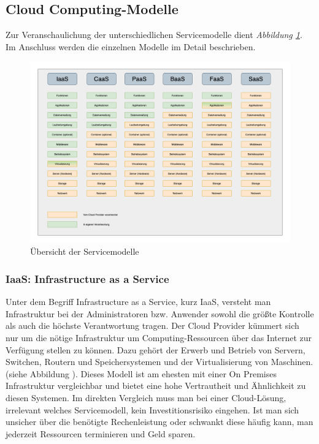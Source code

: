 \clearpage

\subsection{Cloud Computing-Modelle}
\label{Servicemodelle}
Zur Veranschaulichung der unterschiedlichen Servicemodelle dient \textit{Abbildung \ref{fig:Servicemodelle}}.
Im Anschluss werden die einzelnen Modelle im Detail beschrieben.


\begin{figure}[htbp]
    \centering
    \includegraphics[width=1.0\textwidth]{30-Serverless-Theorie/ServiceModelle.png}
    \caption{Übersicht der Servicemodelle}
    \label{fig:Servicemodelle}
\end{figure}


   \subsubsection{IaaS: Infrastructure as a Service}
   Unter dem Begriff Infrastructure as a Service, kurz IaaS, versteht man Infrastruktur bei der Administratoren bzw. Anwender sowohl die größte Kontrolle als auch die höchste Verantwortung tragen.
   Der Cloud Provider kümmert sich nur um die nötige Infrastruktur um Computing-Ressourcen über das Internet zur Verfügung stellen zu können.
   Dazu gehört der Erwerb und Betrieb von Servern, Switchen, Routern und Speichersystemen und der Virtualisierung von Maschinen.(siehe Abbildung \textit{}).
   Dieses Modell ist am ehesten mit einer On Premises Infrastruktur vergleichbar und bietet eine hohe Vertrautheit und Ähnlichkeit zu diesen Systemen.
   Im direkten Vergleich muss man bei einer Cloud-Lösung, irrelevant welches Servicemodell, kein Investitionsrisiko eingehen.
   Ist man sich unsicher über die benötigte Rechenleistung oder schwankt diese häufig kann, man jederzeit Ressourcen terminieren und Geld sparen.

